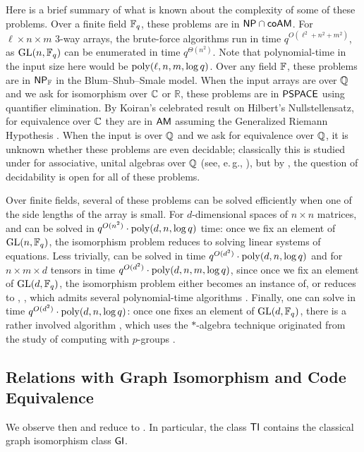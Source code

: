 \begin{remark}
Here is a brief summary of what is known about the complexity of some of these 
problems.
Over a finite field $\mathbb{F}_q$, these problems are in $\mathsf{NP}\cap \mathsf{coAM}$. For $\ell \times n \times m$ 3-way arrays, the brute-force algorithms run in time $q^{O(\ell^2 + n^2 + m^2)}$, 
as $\mathrm{GL}(n,\mathbb{F}_q)$ can be enumerated in time $q^{\Theta(n^2)}$. Note 
that polynomial-time in the input size here would be $\mathrm{poly}(\ell, n, m, \log q)$.
Over any field $\mathbb{F}$, these problems are in $\mathsf{NP}_{\mathbb{F}}$ in the Blum--Shub--Smale model. 
When the input arrays are over $\mathbb{Q}$ and we ask for isomorphism over $\mathbb{C}$ or 
$\mathbb{R}$, these problems are in $\mathsf{PSPACE}$ using quantifier elimination. By 
Koiran's celebrated result on Hilbert's Nullstellensatz, for equivalence over $\mathbb{C}$ 
they are in $\mathsf{AM}$ assuming the Generalized Riemann Hypothesis \cite{Koi96}. 
When the input is over $\mathbb{Q}$ and we ask for equivalence over $\mathbb{Q}$, it is unknown 
whether these problems are even decidable; classically this is studied under 
\AlgIsolong for associative, unital algebras over 
$\mathbb{Q}$ (see, e.\,g., \cite{AS06, Poonen}), but by 
, the question of decidability is open for all of these problems.

Over finite fields,
several of these problems can be solved efficiently when one of the side lengths 
of the array is small. For $d$-dimensional spaces of $n \times n$ matrices, \MatSpConjlong and 
can be solved in 
$q^{O(n^2)}\cdot \mathrm{poly}(d,n,\log q)$ time: once we fix an element of 
$\mathrm{GL}(n,\mathbb{F}_q)$, the isomorphism problem reduces to solving linear systems of equations.
Less trivially, \MatSpConjlongWords 
can be solved in time 
$q^{O(d^2)}\cdot \mathrm{poly}(d,n,\log q)$ and \ThreeTI for $n \times m \times d$ tensors 
in time $q^{O(d^2)}\cdot \mathrm{poly}(d,n,m,\log q)$, since once we fix an element of 
$\mathrm{GL}(d,\mathbb{F}_q)$, the isomorphism problem either becomes an instance of, or reduces to 
\cite{IQ17},  , which admits several polynomial-time 
algorithms \cite{BL08, CIK97, IKS10, Sergeichuk2000}. Finally, one can solve 
\MatSpIsomlongWords in time $q^{O(d^2)}\cdot 
\mathrm{poly}(d,n, \log q)$: once one fixes an element 
of 
$\mathrm{GL}(d,\mathbb{F}_q)$, there is a rather involved algorithm  
\cite{IQ17}, which uses the $*$-algebra technique originated from the study of 
computing with 
$p$-groups \cite{Wil09a,BW12}.
\end{remark}

\subsection{Relations with Graph Isomorphism and Code 
Equivalence}\label{sec:GI_code}
We observe then \GIlong and \CodeEqlong reduce to \ThreeTIlong. In particular, the 
class $\mathsf{TI}$ contains the classical graph isomorphism class $\mathsf{GI}$. 

